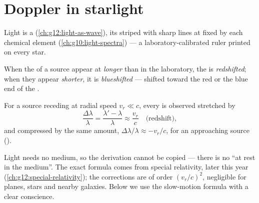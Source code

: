 \section{Doppler in starlight}

Light is a  (\cref{ch:g12:light-as-wave}), its  striped with sharp lines at
 fixed by each chemical element (\cref{ch:g10:light-spectra}) --- a
laboratory-calibrated ruler printed on every star.

\begin{definition}\label{def:g12:doppler-effect:redshift}
When the  of a source appear at  \emph{longer} than in the
laboratory, the  is \emph{redshifted}; when they appear \emph{shorter},
it is \emph{blueshifted} --- shifted toward the red or the blue end of
the .
\end{definition}

\begin{proposition}\label{prop:g12:doppler-effect:light}
For a source receding at radial speed $v_r \ll c$, every  is observed
stretched by
\[ \frac{\Delta \lambda}{\lambda} = \frac{\lambda' - \lambda}{\lambda} \approx \frac{v_r}{c} \quad \text{(redshift)}, \]
and compressed by the same amount, $\Delta\lambda/\lambda \approx -v_r/c$, for an approaching
source ().
\end{proposition}
\admitted

\begin{remark}\label{rem:g12:doppler-effect:honest}
Light needs no medium, so the  derivation cannot be copied --- there is no ``at rest
in the medium''. The exact formula comes from special relativity, later this year
(\cref{ch:g12:special-relativity}); the corrections are of order $(v_r/c)^2$, negligible for
planes, stars and nearby galaxies. Below we use the slow-motion formula with a clear conscience.
\end{remark}

